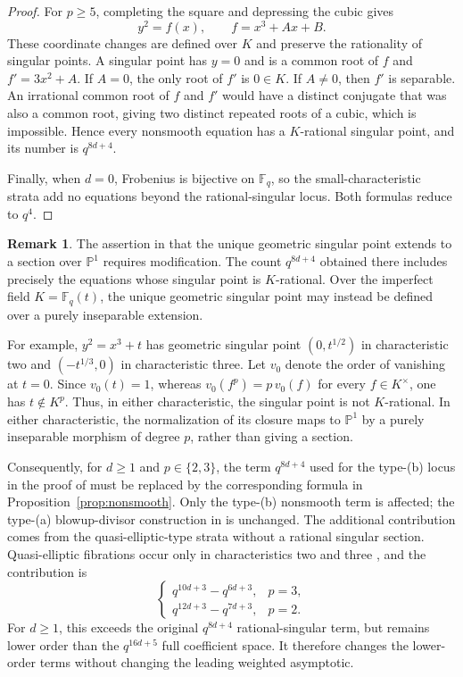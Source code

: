 \documentclass[a4paper,12pt]{amsart}
\theoremstyle{definition}
\newtheorem{rmk}[thm]{Remark}
\newcommand{\Fb}{\mathbb{F}}
\newcommand{\Pb}{\mathbb{P}}
\begin{document}
\begin{proof}
For $p\geq5$, completing the square and depressing the cubic gives
\[
y^2=f(x),
\qquad
f=x^3+Ax+B.
\]
These coordinate changes are defined over $K$ and preserve the rationality of singular points.  A singular point has $y=0$ and is a common root of $f$ and $f'=3x^2+A$.  If $A=0$, the only root of $f'$ is $0\in K$.  If $A\neq0$, then $f'$ is separable.  An irrational common root of $f$ and $f'$ would have a distinct conjugate that was also a common root, giving two distinct repeated roots of a cubic, which is impossible. Hence every nonsmooth equation has a $K$-rational singular point, and its number is $q^{8d+4}$.

Finally, when $d=0$, Frobenius is bijective on $\Fb_q$, so the small-characteristic strata add no equations beyond the rational-singular locus.  Both formulas reduce to $q^4$.
\end{proof}

\begin{rmk}
\label{rmk:dejong-gap}
The assertion in \cite[Section~4.11]{dJ2} that the unique geometric singular point extends to a section over $\Pb^1$ requires modification. The count $q^{8d+4}$ obtained there includes precisely the equations whose singular point is $K$-rational.  Over the imperfect field $K=\Fb_q(t)$, the unique geometric singular point may instead be defined over a purely inseparable extension.

For example, $y^2=x^3+t$ has geometric singular point $(0,t^{1/2})$ in characteristic two and $(-t^{1/3},0)$ in characteristic three.  Let $v_0$ denote the order of vanishing at $t=0$.  Since $v_0(t)=1$, whereas $v_0(f^p)=p\,v_0(f)$ for every $f\in K^\times$, one has $t\notin K^p$. Thus, in either characteristic, the singular point is not $K$-rational. In either characteristic, the normalization of its closure maps to $\Pb^1$ by a purely inseparable morphism of degree $p$, rather than giving a section.

Consequently, for $d\geq1$ and $p\in\{2,3\}$, the term $q^{8d+4}$ used for the type-(b) locus in the proof of \cite[Proposition~4.12]{dJ2} must be replaced by the corresponding formula in Proposition~\ref{prop:nonsmooth}. Only the type-(b) nonsmooth term is affected; the type-(a) blowup-divisor construction in \cite[Section~4.11]{dJ2} is unchanged.  The additional contribution comes from the quasi-elliptic-type strata without a rational singular section.  Quasi-elliptic fibrations occur only in characteristics two and three \cite{BMIII}, and the contribution is
\[
\begin{cases}
q^{10d+3}-q^{6d+3},&p=3,\\
q^{12d+3}-q^{7d+3},&p=2.
\end{cases}
\]
For $d\geq1$, this exceeds the original $q^{8d+4}$ rational-singular term, but remains lower order than the $q^{16d+5}$ full coefficient space.  It therefore changes the lower-order terms without changing the leading weighted asymptotic.
\end{rmk}
\end{document}
